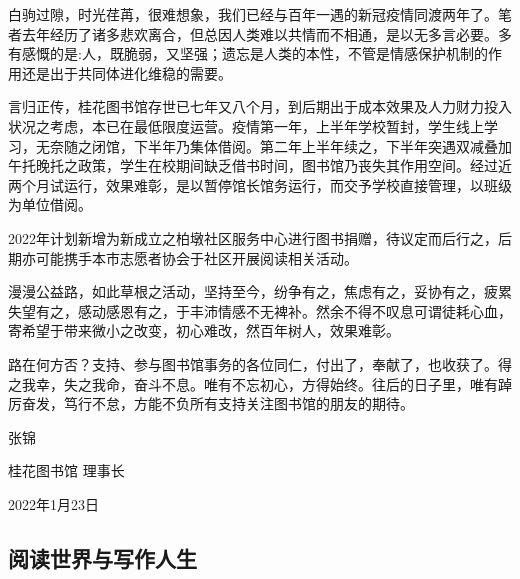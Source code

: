 白驹过隙，时光荏苒，很难想象，我们已经与百年一遇的新冠疫情同渡两年了。笔者去年经历了诸多悲欢离合，但总因人类难以共情而不相通，是以无多言必要。多有感慨的是:人，既脆弱，又坚强；遗忘是人类的本性，不管是情感保护机制的作用还是出于共同体进化维稳的需要。

言归正传，桂花图书馆存世已七年又八个月，到后期出于成本效果及人力财力投入状况之考虑，本已在最低限度运营。疫情第一年，上半年学校暂封，学生线上学习，无奈随之闭馆，下半年乃集体借阅。第二年上半年续之，下半年突遇双减叠加午托晚托之政策，学生在校期间缺乏借书时间，图书馆乃丧失其作用空间。经过近两个月试运行，效果难彰，是以暂停馆长馆务运行，而交予学校直接管理，以班级为单位借阅。

2022年计划新增为新成立之柏墩社区服务中心进行图书捐赠，待议定而后行之，后期亦可能携手本市志愿者协会于社区开展阅读相关活动。

漫漫公益路，如此草根之活动，坚持至今，纷争有之，焦虑有之，妥协有之，疲累失望有之，感动感恩有之，于丰沛情感不无裨补。然余不得不叹息可谓徒耗心血，寄希望于带来微小之改变，初心难改，然百年树人，效果难彰。

路在何方否？支持、参与图书馆事务的各位同仁，付出了，奉献了，也收获了。得之我幸，失之我命，奋斗不息。唯有不忘初心，方得始终。往后的日子里，唯有踔厉奋发，笃行不怠，方能不负所有支持关注图书馆的朋友的期待。
        








\vspace{10pt}


张锦

桂花图书馆 理事长

2022年1月23日
                



\vspace{10pt}

\hline





\vspace{10pt}

{\centering\subsection*{阅读世界与写作人生}}


\renewcommand{\leftmark}{阅读世界与  写作人生}

